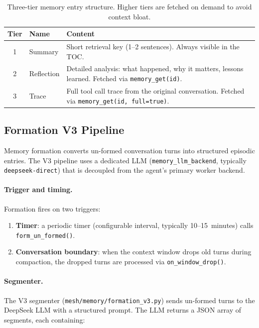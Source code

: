 \documentclass[11pt,a4paper]{article}
\newcommand{\code}[1]{\texttt{#1}}
\begin{document}
\begin{table}[h]
\centering
\small
\begin{tabular}{@{}clL{7cm}@{}}
\toprule
\textbf{Tier} & \textbf{Name} & \textbf{Content} \\
 & Summary   & Short retrieval key (1--2 sentences). Always visible
                in the TOC. \\
2 & Reflection & Detailed analysis: what happened, why it matters,
                  lessons learned. Fetched via \code{memory\_get(id)}. \\
3 & Trace      & Full tool call trace from the original conversation.
                  Fetched via \code{memory\_get(id, full=true)}. \\
\bottomrule
\end{tabular}
\caption{Three-tier memory entry structure. Higher tiers are fetched on
demand to avoid context bloat.}
\label{tab:memory-tiers}
\end{table}

\subsection{Formation V3 Pipeline}

Memory formation converts un-formed conversation turns into structured
episodic entries. The V3 pipeline uses a dedicated LLM
(\code{memory\_llm\_backend}, typically \code{deepseek-direct}) that is
decoupled from the agent's primary worker backend.

\paragraph{Trigger and timing.}
Formation fires on two triggers:
\begin{enumerate}[nosep]
  \item \textbf{Timer}: a periodic timer (configurable interval, typically
        10--15~minutes) calls \code{form\_un\_formed()}.
  \item \textbf{Conversation boundary}: when the context window drops
        old turns during compaction, the dropped turns are processed
        via \code{on\_window\_drop()}.
\end{enumerate}

\paragraph{Segmenter.}
The V3 segmenter (\code{mesh/memory/formation\_v3.py}) sends un-formed
turns to the DeepSeek LLM with a structured prompt. The LLM returns a
JSON array of segments, each containing:
\end{document}
